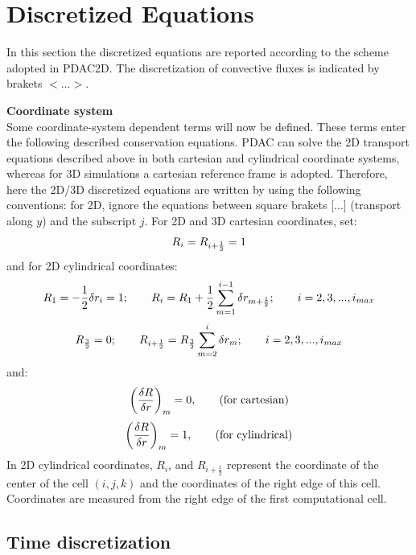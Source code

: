 \section{Discretized Equations \label{ch:FV}}
In this section the discretized equations are reported according to the scheme adopted
in PDAC2D. The discretization of convective fluxes is indicated by brakets
$<...>$. 

{\bf Coordinate system}\\
Some coordinate-system dependent terms will now be defined.
These terms enter the following described conservation equations.
PDAC can solve the 2D transport equations described above in both cartesian
and cylindrical coordinate systems, whereas for 3D simulations a cartesian
reference frame is adopted. Therefore, here the 2D/3D discretized equations
are written by using the following conventions: for 2D, ignore the equations
between square brakets $\Bigg[...\Bigg]$ (transport along $y$) and the subscript $j$.
For 2D and 3D cartesian coordinates, set:
%
\begin{eqnarray}
\htmlimage{}
R_{i} =  R_{i+\frac{1}{2}} = 1
\nonumber
\end{eqnarray}
%
and for 2D cylindrical coordinates:
%
\begin{eqnarray}
\htmlimage{}
R_{1} =  -\frac{1}{2} \delta r_{i} = 1;
\qquad R_{i} =  R_{1}+\frac{1}{2} \sum_{m=1}^{i-1}
\delta r_{m+\frac{1}{2}};\qquad i=2,3,...,i_{max}
\nonumber
\end{eqnarray}
%
\begin{eqnarray}
\htmlimage{}
R_{\frac{3}{2}} =  0; \qquad R_{i+\frac{1}{2}} =  R_{\frac{3}{2}} \sum_{m=2}^{i}
\delta r_{m}; \qquad i = 2,3,...,i_{max}
\nonumber
\end{eqnarray}
%
and:
%
\begin{eqnarray}
\htmlimage{}
\bigg(\frac{\delta R}{\delta r}\bigg)_m  =  0, \qquad \mbox{\rm (for cartesian)}
\nonumber
\end{eqnarray}
%
\begin{eqnarray}
\htmlimage{}
\bigg(\frac{\delta R}{\delta r}\bigg)_m  =  1, \qquad \mbox{\rm (for cylindrical)}
\nonumber
\end{eqnarray}
%
In 2D cylindrical coordinates, $R_{i}$, and $R_{i+\frac{1}{2}}$ represent the coordinate
of the center of the cell $(i,j,k)$ and the coordinates of the right edge of this cell.
Coordinates are measured from the right edge of the first computational cell.\\


\subsection{Time discretization}

